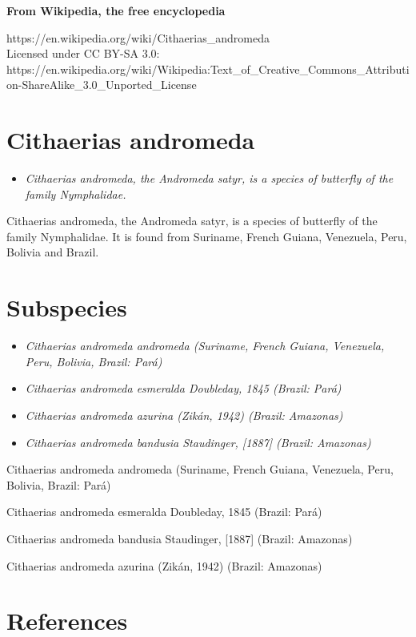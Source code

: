 \textbf{From Wikipedia, the free encyclopedia}

https://en.wikipedia.org/wiki/Cithaerias\_andromeda\\
Licensed under CC BY-SA 3.0:\\
https://en.wikipedia.org/wiki/Wikipedia:Text\_of\_Creative\_Commons\_Attribution-ShareAlike\_3.0\_Unported\_License

\section{Cithaerias andromeda}\label{cithaerias-andromeda}

\begin{itemize}
\item
  \emph{Cithaerias andromeda, the Andromeda satyr, is a species of
  butterfly of the family Nymphalidae.}
\end{itemize}

Cithaerias andromeda, the Andromeda satyr, is a species of butterfly of
the family Nymphalidae. It is found from Suriname, French Guiana,
Venezuela, Peru, Bolivia and Brazil.

\section{Subspecies}\label{subspecies}

\begin{itemize}
\item
  \emph{Cithaerias andromeda andromeda (Suriname, French Guiana,
  Venezuela, Peru, Bolivia, Brazil: Pará)}
\item
  \emph{Cithaerias andromeda esmeralda Doubleday, 1845 (Brazil: Pará)}
\item
  \emph{Cithaerias andromeda azurina (Zikán, 1942) (Brazil: Amazonas)}
\item
  \emph{Cithaerias andromeda bandusia Staudinger, {[}1887{]} (Brazil:
  Amazonas)}
\end{itemize}

Cithaerias andromeda andromeda (Suriname, French Guiana, Venezuela,
Peru, Bolivia, Brazil: Pará)

Cithaerias andromeda esmeralda Doubleday, 1845 (Brazil: Pará)

Cithaerias andromeda bandusia Staudinger, {[}1887{]} (Brazil: Amazonas)

Cithaerias andromeda azurina (Zikán, 1942) (Brazil: Amazonas)

\section{References}\label{references}
